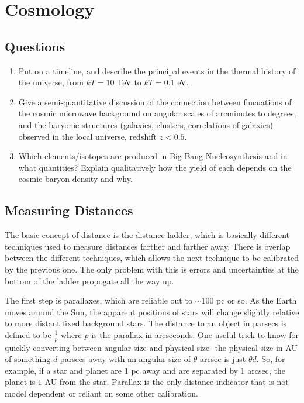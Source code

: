 \section{Cosmology}
\subsection{Questions}
\begin{enumerate}
\item Put on a timeline, and describe the principal events in the thermal history of the
universe, from $kT = 10$ TeV to $kT = 0.1$ eV.
\item Give a semi-quantitative discussion of the connection between flucuations of the
cosmic microwave background on angular scales of arcminutes to degrees, and the
baryonic structures (galaxies, clusters, correlations of galaxies) observed in the local
universe, redshift $z < 0.5$.
\item Which elements/isotopes are produced in Big Bang Nucleosynthesis and in what
quantities? Explain qualitatively how the yield of each depends on the cosmic baryon
density and why.
\end{enumerate}

\subsection{Measuring Distances}
The basic concept of distance is the distance ladder, which is basically 
different techniques used to measure distances farther and farther away.  
There is overlap between the different techniques, which allows the next 
technique to be calibrated by the previous one.  The only problem with this 
is errors and uncertainties at the bottom of the ladder propogate all the 
way up.  

The first step is parallaxes, which are reliable out to $\sim100$ pc or so.  As 
the Earth moves around the Sun, the apparent positions of stars will change 
slightly relative to more distant fixed background stars.  The distance 
to an object in parsecs is defined to be $\frac{1}{p}$ where $p$ is the 
parallax in arcseconds.  One useful trick to know for quickly converting 
between angular size and physical size- the physical size in AU of something 
$d$ parsecs away with an angular size of $\theta$ arcsec is just $\theta d$.  
So, for example, if a star and planet are $1$ pc away and are separated by 
$1$ arcsec, the planet is $1$ AU from the star.  Parallax is the only 
distance indicator that is not model dependent or reliant on some other 
calibration.  

